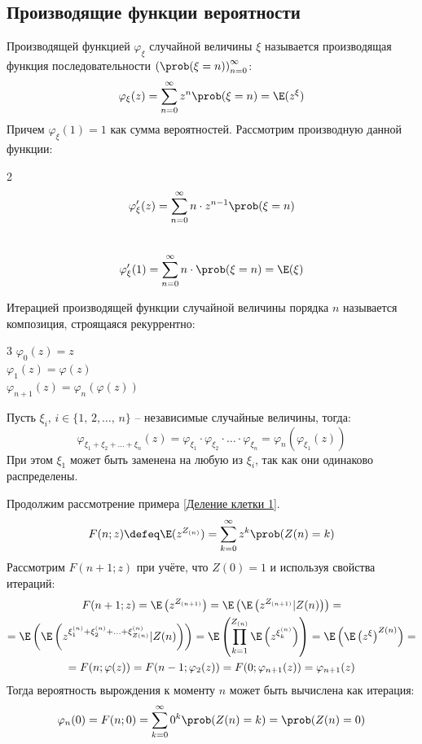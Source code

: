 \documentclass[12pt]{article}
\begin{document}
\subsection{Производящие функции вероятности}

\begin{definition}
    Производящей функцией $\varphi_\xi$ случайной величины $\xi$ называется производящая функция последовательности $\left(\prob(\xi=n)\right)^\infty_{n=0}$:
    $$\varphi_\xi(z)=\sum_{n=0}^{\infty}z^n\prob(\xi=n)=\E(z^\xi)$$
    Причем $\varphi_\xi(1)=1$ как сумма вероятностей. Рассмотрим производную данной функции:
    \begin{multicols}{2}
        \centering
        \[\varphi'_\xi(z)=\sum_{n=0}^\infty n\cdot z^{n-1}\prob(\xi=n)\]\\
        \[\varphi'_\xi(1)=\sum_{n=0}^\infty n\cdot \prob(\xi=n)=\E(\xi)\]
    \end{multicols}
\end{definition}
\begin{definition}
    Итерацией производящей функции случайной величины порядка $n$ называется композиция, строящаяся рекуррентно:
    \begin{multicols}{3}
        \centering
        $\varphi_0(z)=z$\\
        $\varphi_1(z)=\varphi(z)$\\
        $\varphi_{n+1}(z)=\varphi_n(\varphi(z))$
    \end{multicols}
\end{definition}
\begin{definition}
    Пусть $\xi_i,\,i\in\{1,\,2,\ldots,\,n\}$ – независимые случайные величины, тогда:
    $$\varphi_{\xi_1+\xi_2+\ldots+\xi_n}(z)=\varphi_{\xi_1}\cdot\varphi_{\xi_2}\cdot\ldots\cdot\varphi_{\xi_n}=\varphi_n(\varphi_{\xi_1}(z))$$
    При этом $\xi_1$ может быть заменена на любую из $\xi_i$, так как они одинаково распределены.
\end{definition}
\begin{example}\label{Деление клетки 2}
    Продолжим рассмотрение примера \ref{Деление клетки 1}.
    $$F(n;z)\defeq\E(z^{Z_{(n)}})=\sum_{k=0}^{\infty}z^k\prob(Z(n)=k)$$
    Рассмотрим $F(n+1;z)$ при учёте, что $Z(0)=1$ и используя свойства итераций:
    \begin{multline*}
        F(n+1;z)=\E\left(z^{Z_{(n+1)}}\right)=\E\left(\E\left(z^{Z_{(n+1)}}|Z(n)\right)\right)=\\
        =\E\left(\E\left(z^{\xi_1^{(n)}+\xi_2^{(n)}+\ldots+\xi_{Z(n)}^{(n)}}|Z(n)\right)\right)=\E\left(\prod_{k=1}^{Z_{(n)}}\E\left(z^{\xi_k^{(n)}}\right)\right)=\E\left(\E\left(z^\xi\right)^{Z(n)}\right)=\\
        =F(n;\varphi(z))=F(n-1;\varphi_2(z))=F(0;\varphi_{n+1}(z))=\varphi_{n+1}(z)
    \end{multline*}
    Тогда вероятность вырождения к моменту $n$ может быть вычислена как итерация:
    $$\varphi_n(0)=F(n;0)=\sum_{k=0}^{\infty}0^k\prob(Z(n)=k)=\prob(Z(n)=0)$$
\end{example}
\end{document}
